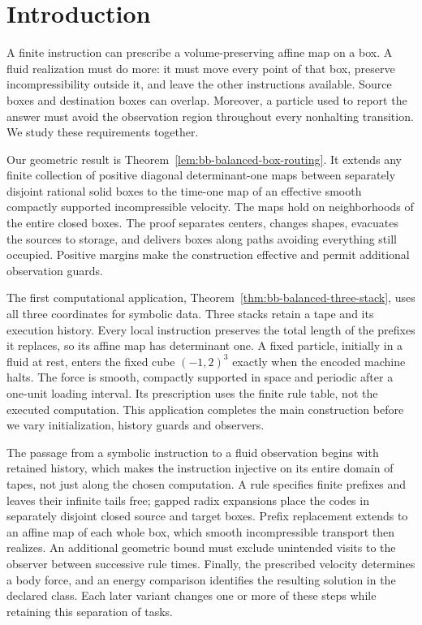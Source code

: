\section{Introduction}\label{sec:introduction}
A finite instruction can prescribe a volume-preserving affine map on a
box. A fluid realization must do more: it must move every point of that
box, preserve incompressibility outside it, and leave the other instructions
available. Source boxes and destination boxes can overlap. Moreover, a
particle used to report the answer must avoid the observation region
throughout every nonhalting transition. We study these requirements together.

Our geometric result is Theorem~\ref{lem:bb-balanced-box-routing}.
It extends any finite collection of positive diagonal determinant-one maps
between separately disjoint rational solid boxes to the time-one map of
an effective smooth compactly supported incompressible velocity. The maps
hold on neighborhoods of the entire closed boxes. The proof separates
centers, changes shapes, evacuates the sources to storage, and delivers
boxes along paths avoiding everything still occupied. Positive margins make
the construction effective and permit additional observation guards.

The first computational application, Theorem~\ref{thm:bb-balanced-three-stack},
uses all three coordinates for symbolic data. Three stacks retain a tape
and its execution history. Every local instruction preserves the total
length of the prefixes it replaces, so its affine map has determinant one.
A fixed particle, initially in a fluid at rest, enters the fixed cube
$(-1,2)^3$ exactly when the encoded machine halts. The force is smooth,
compactly supported in space and periodic after a one-unit loading interval.
Its prescription uses the finite rule table, not the executed computation.
This application completes the main construction before we vary
initialization, history guards and observers.

The passage from a symbolic instruction to a fluid observation begins
with retained history, which makes the instruction injective on its
entire domain of tapes, not just along the chosen computation. A rule
specifies finite prefixes and leaves their infinite tails free; gapped
radix expansions place the codes in separately disjoint closed source
and target boxes. Prefix replacement extends to an affine map of each
whole box, which smooth incompressible transport then realizes.
An additional geometric bound must exclude unintended visits to
the observer between successive rule times. Finally, the prescribed
velocity determines a body force, and an energy comparison identifies
the resulting solution in the declared class. Each later variant changes
one or more of these steps while retaining this separation of tasks.

